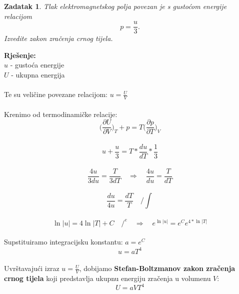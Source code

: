 \documentclass[a4paper,12pt]{article}
\newtheorem{ZDK}{Zadatak}[section]
\begin{document}
\newpage
\begin{ZDK}
	Tlak elektromagnetskog polja povezan je s gusto\'com energije relacijom 
	$$ p=\frac{u}{3}. $$
	Izvedite zakon zra\v{c}enja crnog tijela.
\end{ZDK}
\textbf{Rje\v{s}enje:} \\
\newline
$u$ - gusto\'ca energije 
\\
$U$ - ukupna energija
\\
\\
Te su veli\v{c}ine povezane relacijom: $u=\frac{U}{V}$
\\
\\
Krenimo od termodinami\v{c}ke relacije:
$$ \Big( \frac{\partial U}{\partial V}  \Big)_T +p=T \Big( \frac{\partial p}{\partial T}  \Big)_V $$
\\
$$ u+\frac{u}{3}=T*\frac{du}{dT}*\frac{1}{3} $$
\\
$$ \frac{4u}{3du}=\frac{T}{3dT} \quad \Rightarrow \quad \frac{4u}{du}=\frac{T}{dT} $$
\\
$$ \frac{du}{4u}=\frac{dT}{T} \quad \Big/ \int $$
\\
$$ \ln{|u|}=4 \ln{|T|}+C \quad \Big/ ^e \quad \Rightarrow \quad e^{\ln{|u|}}=e^C e^{4*\ln{|T|}} $$
\\
Supstituiramo integracijsku konstantu: $a=e^C$
\\
$$ u=aT^4 $$
\\
Uvr\v{s}tavaju\'ci izraz $u=\frac{U}{V}$, dobijamo \textbf{Stefan-Boltzmanov zakon zra\v{c}enja crnog tijela}
koji predstavlja ukupnu energiju zra\v{c}enja u volumenu $V$:
\\
$$ U=aVT^4 $$
\end{document}
